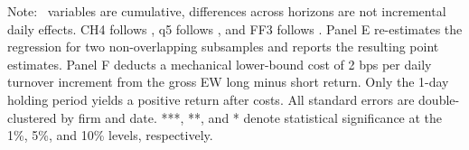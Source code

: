 \documentclass[12pt]{article}
\newenvironment{tablenoteblock}
{%
  \vspace{0.12cm}
  \begin{tablenotes}[flushleft]
  \footnotesize
  \setlength{\itemsep}{0pt}
  \setlength{\parsep}{0pt}
  \item[]\justifying
  \textnormal{Note:}\ 
}
{%
  \end{tablenotes}
}
\begin{document}
\begin{table}[H]
\begin{threeparttable}
\begin{tablenoteblock}
    variables are cumulative, differences across horizons are not incremental daily effects.
    CH4 follows \citet{liu2019}, q5 follows \citet{hou2020replicating}, and FF3 follows
    \citet{fama1993common}.
    Panel E re-estimates the regression for two non-overlapping subsamples and reports the
    resulting point estimates.
    Panel F deducts a mechanical lower-bound cost of 2 bps per daily turnover increment from the gross
    EW long minus short return. Only the 1-day holding period yields a positive return after costs.
    All standard errors are double-clustered by firm and date.
    ***, **, and * denote statistical significance at the 1\%, 5\%, and 10\% levels, respectively.
  \end{tablenoteblock}
  \end{threeparttable}
\end{table}
\clearpage
\end{document}
